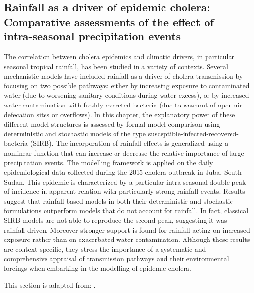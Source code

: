 \begin{fullwidth}
\chapter[Rainfall as a driver of epidemic cholera: Comparative assessments of the effect of intra-seasonal precipitation events]{Rainfall as a driver of epidemic cholera:\\Comparative assessments of the effect of\\intra-seasonal precipitation events}\label{ch:cholera-rainfall}

The correlation between cholera epidemics and climatic drivers, in particular seasonal tropical rainfall, has been studied in a variety of contexts. Several mechanistic models have included rainfall as a driver of cholera transmission by focusing on two possible pathways: either by increasing exposure to contaminated water (\eg due to worsening sanitary conditions during water excess), or by increased water contamination with freshly excreted bacteria (\eg due to washout of open-air defecation sites or overflows). In this chapter, the explanatory power of these different model structures is assessed by formal model comparison using deterministic and stochastic models of the type susceptible-infected-recovered-bacteria (SIRB). The incorporation of rainfall effects is generalized using a nonlinear function that can increase or decrease the relative importance of large precipitation events. The modelling framework is applied on the daily epidemiological data collected during the 2015 cholera outbreak in Juba, South Sudan. This epidemic is characterized by a particular intra-seasonal double peak of incidence in apparent relation with particularly strong rainfall events. Results suggest that rainfall-based models in both their deterministic and stochastic formulations outperform models that do not account for rainfall. In fact, classical SIRB models are not able to reproduce the second peak, suggesting it was rainfall-driven. Moreover stronger support is found for rainfall acting on increased exposure rather than on exacerbated water contamination. Although these results are context-specific, they stress the importance of a systematic and comprehensive appraisal of transmission pathways and their environmental forcings when embarking in the modelling of epidemic cholera.

This section is adapted from:
.%
\end{fullwidth}

